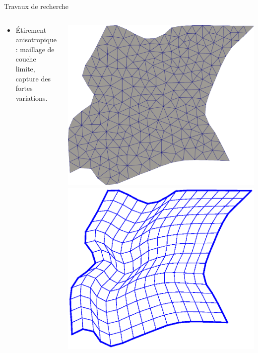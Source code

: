 \documentclass[compress,10pt,aspectratio=169]{beamer}
\begin{document}
\begin{frame}{Travaux de recherche}
\begin{columns}
\begin{column}{0.8\textwidth}
\begin{itemize}
\item {\color{onera} Étirement anisotropique :} maillage de couche limite, capture des fortes variations.\\\vspace{0.25cm}
\end{itemize}
    \end{column}
    \begin{column}{0.24\textwidth}
        \centering
        \includegraphics[scale=0.11]{images/zone4beamer.pdf}
        \includegraphics[scale=0.35]{images/mesh_zone4.eps}
    \end{column}
\end{columns}
\end{frame}
\end{document}
